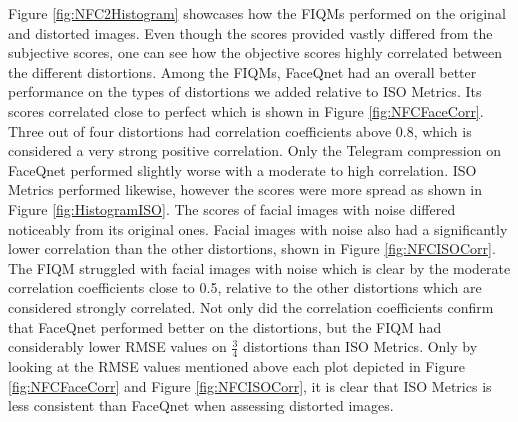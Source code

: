 Figure \ref{fig:NFC2Histogram} showcases how the FIQMs performed on the original and distorted images. Even though the scores provided vastly differed from the subjective scores, one can see how the objective scores highly correlated between the different distortions. Among the FIQMs, FaceQnet had an overall better performance on the types of distortions we added relative to ISO Metrics. Its scores correlated close to perfect which is shown in Figure \ref{fig:NFCFaceCorr}. Three out of four distortions had correlation coefficients above 0.8, which is considered a very strong positive correlation. Only the Telegram compression on FaceQnet performed slightly worse with a moderate to high correlation. ISO Metrics performed likewise, however the scores were more spread as shown in Figure \ref{fig:HistogramISO}. The scores of facial images with noise differed noticeably from its original ones. Facial images with noise also had a significantly lower correlation than the other distortions, shown in Figure \ref{fig:NFCISOCorr}. The FIQM struggled with facial images with noise which is clear by the moderate correlation coefficients close to 0.5, relative to the other distortions which are considered strongly correlated. Not only did the correlation coefficients confirm that FaceQnet performed better on the distortions, but the FIQM had considerably lower RMSE values on $\frac{3}{4}$ distortions than ISO Metrics. Only by looking at the RMSE values mentioned above each plot depicted in Figure \ref{fig:NFCFaceCorr} and Figure \ref{fig:NFCISOCorr}, it is clear that ISO Metrics is less consistent than FaceQnet when assessing distorted images. 


